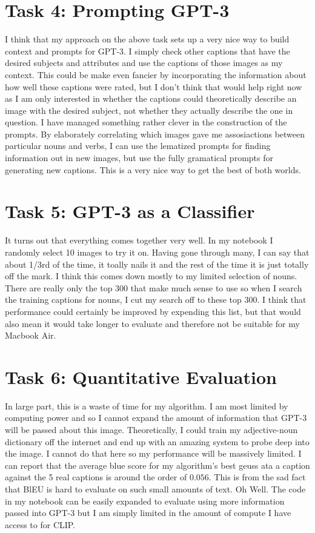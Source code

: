 \documentclass{article}
\begin{document}
\section*{Task 4: Prompting GPT-3}
I think that my approach on the above task sets up a very nice way to build context and prompts for GPT-3. I simply check other captions that have the desired subjects and attributes and use the captions of those images as my context. This could be make even fancier by incorporating the information about how well these captions were rated, but I don't think that would help right now as I am only interested in whether the captions could theoretically describe an image with the desired subject, not whether they actually describe the one in question. I have managed something rather clever in the construction of the prompts. By elaborately correlating which images gave me assosiactions between particular nouns and verbs, I can use the lematized prompts for finding information out in new images, but use the fully gramatical prompts for generating new captions. This is a very nice way to get the best of both worlds. 

\section*{Task 5: GPT-3 as a Classifier}
It turns out that everything comes together very well. In my notebook I randomly select 10 images to try it on. Having gone through many, I can say that about 1/3rd of the time, it toally nails it and the rest of the time it is just totally off the mark. I think this comes down mostly to my limited selection of nouns. There are really only the top 300 that make much sense to use so when I search the training captions for nouns, I cut my search off to these top 300. I think that performance could certainly be improved by expending this list, but that would also mean it would take longer to evaluate and therefore not be suitable for my Macbook Air.


\section*{Task 6: Quantitative Evaluation}
In large part, this is a waste of time for my algorithm. I am most limited by computing power and so I cannot expand the amount of information that GPT-3 will be passed about this image. Theoretically, I could train my adjective-noun dictionary off the internet and end up with an amazing system to probe deep into the image. I cannot do that here so my performance will be massively limited. I can report that the average blue score for my algorithm's best geuss ata a caption against the 5 real captions is around the order of $0.056$. This is from the sad fact that BlEU is hard to evaluate on such small amounts of text. Oh Well. The code in my notebook can be easily expanded to evaluate using more information passed into GPT-3 but I am simply limited in the amount of compute I have access to for CLIP.
\end{document}

